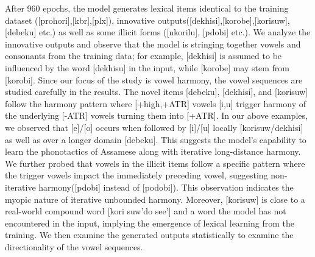 \documentclass{Interspeech2024}
\begin{document}
After 960 epochs, the model generates lexical items identical to the training dataset ([prohori],[\textepsilon k\textepsilon b\textscripta r\textepsilon],[p\textopeno l\textopeno x]), innovative outputs([dekhisi],[korobe],[korisuw\textscripta],[debeku] etc.) as well as some illicit forms ([n\textopeno korilu], [p\textopeno dobi] etc.). We analyze the innovative outputs and observe that the model is stringing together vowels and consonants from the training data; for example, [dekhisi] is assumed to be influenced by the word [dekhisu] in the input, while [korobe] may stem from [korobi]. Since our focus of the study is vowel harmony, the vowel sequences are studied carefully in the results. The novel items [debeku], [dekhisi], and [korisuw\textscripta] follow the harmony pattern where [+high,+ATR] vowels [i,u] trigger harmony of the underlying [-ATR] vowels turning them into [+ATR]. In our above examples, we observed that [e]/[o] occurs when followed by [i]/[u] locally [korisuw\textscripta/dekhisi] as well as over a longer domain [debeku]. This suggests the model's capability to learn the phonotactics of Assamese along with iterative long-distance harmony. We further probed that vowels in the illicit items follow a specific pattern where the trigger vowels impact the immediately preceding vowel, suggesting non-iterative harmony([p\textopeno dobi] instead of [podobi]). This observation indicates the myopic nature of iterative unbounded harmony\cite{wilson_unbounded_2006}. Moreover, [korisuw\textscripta] is close to a real-world compound word [kori suw\textscripta 'do see'] and a word the model has not encountered in the input, implying the emergence of lexical learning from the training. We then examine the generated outputs statistically to examine the directionality of the vowel sequences. 
\end{document}
